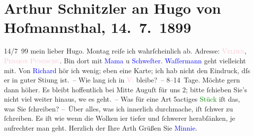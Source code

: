 

               \section[Arthur Schnitzler an Hugo von Hofmannsthal, 14. 7. 1899]{ Arthur Schnitzler an Hugo von Hofmannsthal, 14. 7. 1899}\nopagebreak{}\rehead{ }\normalsize\beginnumbering{} \toendnotes[C]{\smallbreak\pagebreak[2]} 
\toendnotes[C]{\smallbreak}\pstart
           \raggedleft{}{\pb}14/7 99\pend
           \pstart
           mein lieber Hugo. Montag reiſe ich wahrſcheinlich ab. Adresse: \textsc{\textcolor{pink}{Velden}{}\ledrightnote{\textcolor{pink}{Velden}}, \textcolor{pink}{Pension Pundschu}{}\ledrightnote{\textcolor{pink}{Pension Pundschu}}}. Bin dort mit \textcolor{blue}{Mama}{} u
                        \textcolor{blue}{Schweſter}{}. \textcolor{blue}{Waſſermann}{}\ledrightnote{\textcolor{blue}{Jakob Wassermann}} geht vielleicht mit. Von \textcolor{blue}{Richard}{}\ledrightnote{\textcolor{blue}{Richard Beer-Hofmann}} hör ich wenig; eben eine Karte; ich
                    hab nicht den Eindruck, dſs er in guter Sti{\geminationm}ung
                    ist. – Wie lang ich in \textcolor{pink}{V.}{}\ledrightnote{\textcolor{pink}{Velden}} bleibe? – 8–14 Tage.
                    Möchte gern dann höher. Es bleibt hoffentlich bei Mitte Auguſt für
                        {\pb}uns 2; bitte ſchieben Sie’s nicht viel weiter
                    hinaus, we{\geminationn} es geht. – Was für eine Art 5actiges
                        \textcolor{green}{Stück}{} iſt das, was Sie
                    ſchreiben? \pend
           \pstart
           – Über alles, was ich innerlich durchmache, iſt ſchwer zu ſchreiben. Es iſt wie
                    wenn die Wolken i{\geminationm}er tiefer und ſchwerer herabſänken, je aufrechter man
                    geht.\pend
           \pstart Herzlich der Ihre \spacefill\mbox{Arth}\pend{}\pstart
           \noindent{}Grüßen Sie \textcolor{blue}{Minnie}{}\ledrightnote{\textcolor{blue}{Hermine von Schaffgotsch}}.\pend
           \endnumbering{}  
      